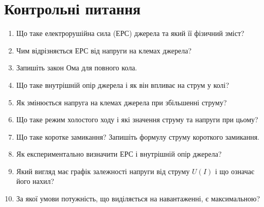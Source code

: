 \documentclass{LabWork}
\begin{document}
\section*{Контрольні питання}

\begin{enumerate}
    \item Що таке електрорушійна сила (ЕРС) джерела та який її фізичний зміст?

    \item Чим відрізняється ЕРС від напруги на клемах джерела?

    \item Запишіть закон Ома для повного кола.

    \item Що таке внутрішній опір джерела і як він впливає на струм у колі?

    \item Як змінюється напруга на клемах джерела при збільшенні струму?

    \item Що таке режим холостого ходу і які значення струму та напруги при цьому?

    \item Що таке коротке замикання? Запишіть формулу струму короткого замикання.

    \item Як експериментально визначити ЕРС і внутрішній опір джерела?

    \item Який вигляд має графік залежності напруги від струму $U(I)$ і що означає його нахил?

    \item За якої умови потужність, що виділяється на навантаженні, є максимальною?
\end{enumerate}
\end{document}
